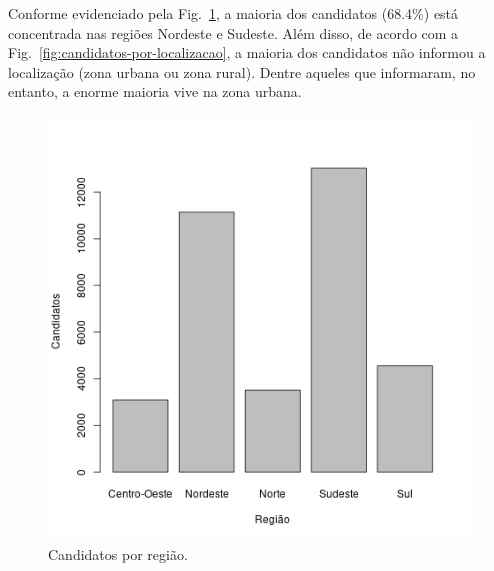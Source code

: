 \documentclass[12pt]{article}
\newcommand{\reffig}[1]{Fig.~\ref{fig:#1}}
\begin{document}
\vspace{1cm}
Conforme evidenciado pela \reffig{candidatos-por-regiao}, a maioria dos candidatos (68.4\%) está concentrada nas regiões Nordeste e Sudeste.
Além disso, de acordo com a \reffig{candidatos-por-localizacao}, a maioria dos candidatos não informou a localização (zona urbana ou zona rural).
Dentre aqueles que informaram, no entanto, a enorme maioria vive na zona urbana.
\begin{minipage}{.5\textwidth}
    \begin{figure}[H]
    \includegraphics[width=.9\linewidth]{../geral_candidatos-por-regiao.png}
    \caption{Candidatos por região.}
    \label{fig:candidatos-por-regiao}
    \end{figure}
\end{minipage}%
\end{document}
